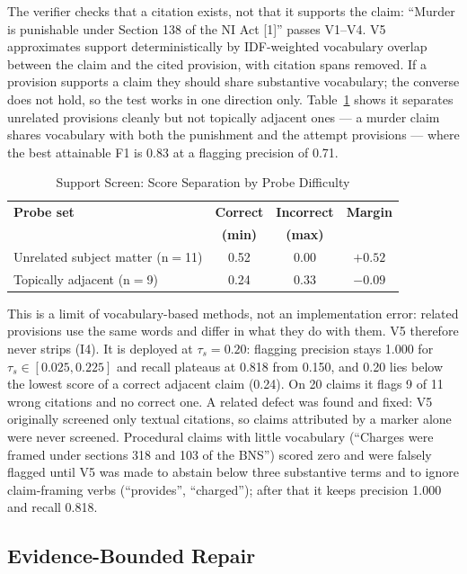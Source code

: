 \documentclass[conference]{IEEEtran}
\begin{document}
The verifier checks that a citation exists, not that it supports the claim: ``Murder is punishable under Section 138 of the NI Act [1]'' passes V1--V4. V5 approximates support deterministically by IDF-weighted vocabulary overlap between the claim and the cited provision, with citation spans removed. If a provision supports a claim they should share substantive vocabulary; the converse does not hold, so the test works in one direction only. Table~\ref{tab:support} shows it separates unrelated provisions cleanly but not topically adjacent ones --- a murder claim shares vocabulary with both the punishment and the attempt provisions --- where the best attainable F1 is 0.83 at a flagging precision of 0.71.

\begin{table}[t]
\caption{Support Screen: Score Separation by Probe Difficulty}
\label{tab:support}
\centering
\footnotesize
\begin{tabular}{@{}lccc@{}}
\toprule
\textbf{Probe set} & \textbf{Correct} & \textbf{Incorrect} & \textbf{Margin} \\
                   & \textbf{(min)}   & \textbf{(max)}     & \\
\midrule
Unrelated subject matter (n$=$11) & 0.52 & 0.00 & $+0.52$ \\
Topically adjacent (n$=$9)        & 0.24 & 0.33 & $\mathbf{-0.09}$ \\
\bottomrule
\end{tabular}
\end{table}

This is a limit of vocabulary-based methods, not an implementation error: related provisions use the same words and differ in what they do with them. V5 therefore never strips (I4). It is deployed at $\tau_s = 0.20$: flagging precision stays 1.000 for $\tau_s \in [0.025, 0.225]$ and recall plateaus at 0.818 from 0.150, and 0.20 lies below the lowest score of a correct adjacent claim (0.24). On 20 claims it flags 9 of 11 wrong citations and no correct one. A related defect was found and fixed: V5 originally screened only textual citations, so claims attributed by a marker alone were never screened. Procedural claims with little vocabulary (``Charges were framed under sections 318 and 103 of the BNS'') scored zero and were falsely flagged until V5 was made to abstain below three substantive terms and to ignore claim-framing verbs (``provides'', ``charged''); after that it keeps precision 1.000 and recall 0.818.

\subsection{Evidence-Bounded Repair}
\end{document}
